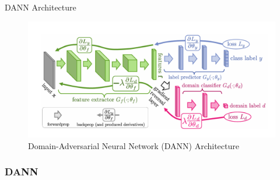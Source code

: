 \documentclass{beamer}
\begin{document}


\begin{frame}{DANN Architecture}
\begin{figure}
    \centering
    \includegraphics[width=0.9\linewidth]{DANN_img.png}
    \caption{Domain-Adversarial Neural Network (DANN) Architecture}
\end{figure}
\end{frame}

\begin{frame}
    \frametitle{DANN}
    
    

\end{frame}
\end{document}
